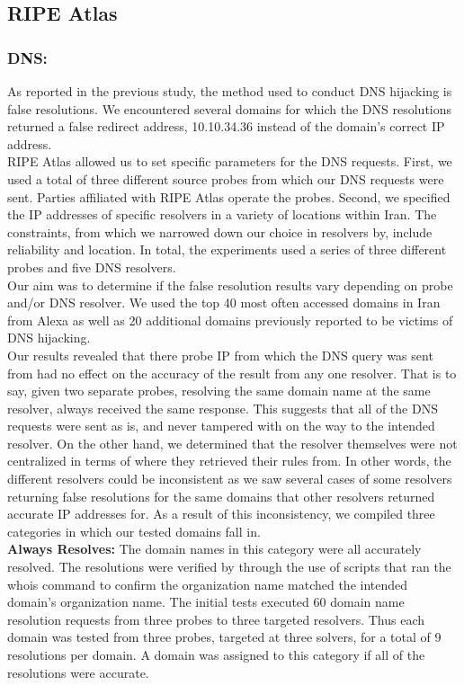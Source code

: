 \subsection{RIPE Atlas }

\subsubsection{DNS:}As reported in the previous study, the method used to conduct DNS hijacking is false resolutions. We encountered several domains for which the DNS resolutions returned a false redirect address, 10.10.34.36 instead of the domain’s correct IP address. \\
RIPE Atlas allowed us to set specific parameters for the DNS requests. First, we used a total of three different source probes from which our DNS requests were sent. Parties affiliated with RIPE Atlas operate the probes. Second, we specified the IP addresses of specific resolvers in a variety of locations within Iran. The constraints, from which we narrowed down our choice in resolvers by, include reliability and location. In total, the experiments used a series of three different probes and five DNS resolvers. \\
Our aim was to determine if the false resolution results vary depending on probe and/or DNS resolver. We used the top 40 most often accessed domains in Iran from Alexa as well as 20 additional domains previously reported to be victims of DNS hijacking.\\
	Our results revealed that there probe IP from which the DNS query was sent from had no effect on the accuracy of the result from any one resolver. That is to say, given two separate probes, resolving the same domain name at the same resolver, always received the same response. This suggests that all of the DNS requests were sent as is, and never tampered with on the way to the intended resolver. On the other hand, we determined that the resolver themselves were not centralized in terms of where they retrieved their rules from. In other words, the different resolvers could be inconsistent as we saw several cases of some resolvers returning false resolutions for the same domains that other resolvers returned accurate IP addresses for. As a result of this inconsistency, we compiled three categories in which our tested domains fall in.\\

\textbf{Always Resolves:} The domain names in this category were all accurately resolved. The resolutions were verified by through the use of scripts that ran the whois command to confirm the organization name matched the intended domain’s organization name. The initial tests executed 60 domain name resolution requests from three probes to three targeted resolvers. Thus each domain was tested from three probes, targeted at three solvers, for a total of 9 resolutions per domain. A domain was assigned to this category if all of the resolutions were accurate.

